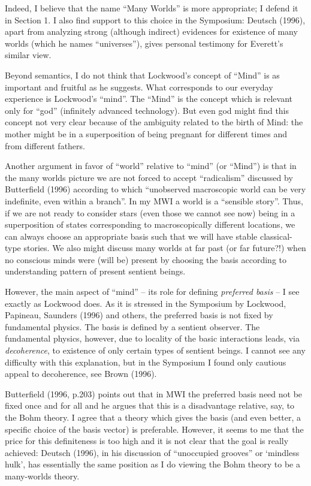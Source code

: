 \documentclass[12pt]{article}
\begin{document}
 Indeed, I believe that the name ``Many Worlds'' is more
appropriate; I defend it in Section 1. I also find support to this
choice in the Symposium:
Deutsch (1996), apart from analyzing strong (although indirect)
evidences for existence of many worlds (which he names ``universes''),
gives personal testimony for Everett's similar view.

Beyond semantics, I do not think that Lockwood's concept of ``Mind''
is as important and fruitful as he suggests. What corresponds to our
everyday experience is Lockwood's ``mind''. The ``Mind'' is the
concept which is relevant only for ``god'' (infinitely advanced
technology). But even god might find this concept not very clear
because of the ambiguity related to the birth of Mind: the mother
might be in a superposition of being pregnant for different times and
from different fathers.
 
Another argument in favor of ``world'' relative to ``mind'' (or
``Mind'') is that in the many worlds picture we are not forced to
accept ``radicalism'' discussed by Butterfield (1996) according to
which ``unobserved macroscopic world can be very indefinite, even
within a branch''. In my MWI a world is a ``sensible story''. Thus, if
we are not ready to consider stars (even those we cannot see now)
being in a superposition of states corresponding to macroscopically
different locations, we can always choose an appropriate basis such that
we will have stable classical-type stories. We also might discuss many
worlds at far past (or far future?!) when no conscious minds were
(will be) present by choosing the basis according to understanding
pattern of present sentient beings.

However, the main aspect of ``mind'' -- its role for defining {\it
  preferred basis} -- I see exactly as Lockwood does.  As it is
stressed in the Symposium by Lockwood, Papineau, Saunders (1996) and
others, the preferred basis is not fixed by fundamental physics. The
basis is defined by a sentient observer. The fundamental physics,
however, due to locality of the basic interactions leads, via {\it
  decoherence}, to existence of only certain types of sentient beings.
I cannot see any difficulty with this explanation, but in the
Symposium I found only cautious appeal to decoherence, see Brown
(1996).

Butterfield (1996, p.203) points out that in MWI the preferred basis
need not be fixed once and for all and he argues that this is a
disadvantage relative, say, to the Bohm theory. I agree that a theory
which gives the basis (and even better, a specific choice of the basis
vector) is preferable. However, it seems to me that the price for this
definiteness is too high and it is not clear that the goal is really
achieved: Deutsch (1996), in his discussion of ``unoccupied grooves''
or `mindless hulk', has essentially the same position as I do viewing
the Bohm theory to be a many-worlds theory.
\end{document}
